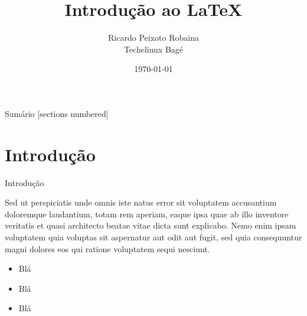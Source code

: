 \documentclass{beamer}
\title{Introdução ao \LaTeX}
\date{\today}
\author{Ricardo Peixoto Robaina \\ Techelinux Bagé}
\institute{Universidade Federal do Pampa}
\begin{document}
	
	\begin{frame}[noframenumbering]
		\titlepage
		\thispagestyle{empty}
	\end{frame}
	
	\begin{frame}{Sumário}
		[sections numbered]
		\tableofcontents[hideallsubsections]
	\end{frame}

\section{Introdução}
\begin{frame}{Introdução}
	
	Sed ut perspiciatis unde omnis iste natus error sit voluptatem accusantium doloremque laudantium, totam rem aperiam, eaque ipsa quae ab illo inventore veritatis et quasi architecto beatae vitae dicta sunt explicabo. Nemo enim ipsam voluptatem quia voluptas sit aspernatur aut odit aut fugit, sed quia consequuntur magni dolores eos qui ratione voluptatem sequi nesciunt. 
	
	\begin{itemize}
		\item Blá
		\item Blá
		\item Blá
	\end{itemize}

\end{frame}
\end{document}
